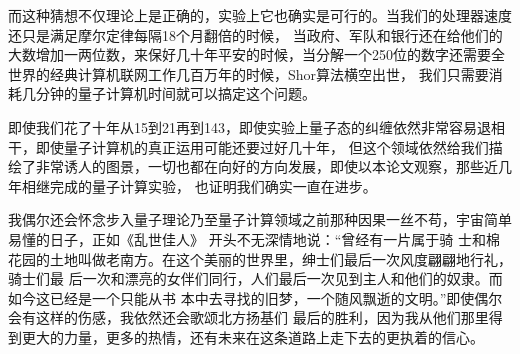 而这种猜想不仅理论上是正确的，实验上它也确实是可行的。当我们的处理器速度还只是满足摩尔定律每隔18个月翻倍的时候，
当政府、军队和银行还在给他们的大数增加一两位数，来保好几十年平安的时候，当分解一个250位的数字还需要全世界的经典计算机联网工作几百万年的时候，Shor算法横空出世，
我们只需要消耗几分钟的量子计算机时间就可以搞定这个问题。

即使我们花了十年从15到21再到143，即使实验上量子态的纠缠依然非常容易退相干，即使量子计算机的真正运用可能还要过好几十年，
但这个领域依然给我们描绘了非常诱人的图景，一切也都在向好的方向发展，即使以本论文观察，那些近几年相继完成的量子计算实验，
也证明我们确实一直在进步。

我偶尔还会怀念步入量子理论乃至量子计算领域之前那种因果一丝不苟，宇宙简单易懂的日子，正如《乱世佳人》
开头不无深情地说：“曾经有一片属于骑
士和棉花园的土地叫做老南方。在这个美丽的世界里，绅士们最后一次风度翩翩地行礼，骑士们最
后一次和漂亮的女伴们同行，人们最后一次见到主人和他们的奴隶。而如今这已经是一个只能从书
本中去寻找的旧梦，一个随风飘逝的文明。”即使偶尔会有这样的伤感，我依然还会歌颂北方扬基们
最后的胜利，因为我从他们那里得到更大的力量，更多的热情，还有未来在这条道路上走下去的更执着的信心。


 

